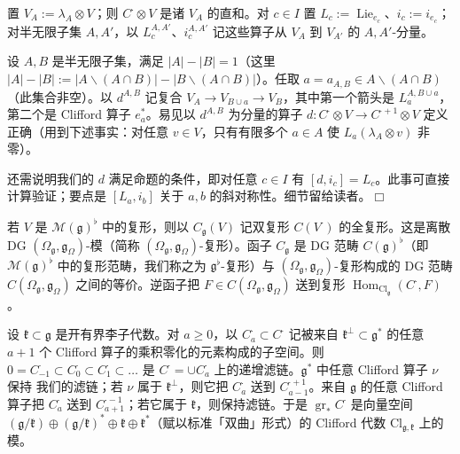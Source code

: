 置 $V_{A}:=\lambda_{A}\otimes V$；则 $C^{\cdot}\otimes V$ 是诸 $V_{A}$ 的直和。对 $c\in I$ 置 $L_{c}:=\operatorname{Lie}_{e_{c}}$、$i_{c}:=i_{e_{c}}$；对半无限子集 $A,A'$，以 $L^{A,A'}_{c}$、$i^{A,A'}_{c}$ 记这些算子从 $V_{A}$ 到 $V_{A'}$ 的 $A,A'$-分量。

设 $A,B$ 是半无限子集，满足 $|A|-|B|=1$（这里 $|A|-|B|:=|A\backslash(A\cap B)|-|B\backslash(A\cap B)|$）。任取 $a=a_{A,B}\in A\backslash(A\cap B)$（此集合非空）。以 $d^{A,B}$ 记复合 $V_{A}\to V_{B\cup a}\to V_{B}$，其中第一个箭头是 $L^{A,B\cup a}_{a}$，第二个是 Clifford 算子 $e^{*}_{a}$。易见以 $d^{A,B}$ 为分量的算子 $d:C^{\cdot}\otimes V\to C^{\cdot+1}\otimes V$ 定义正确（用到下述事实：对任意 $v\in V$，只有有限多个 $a\in A$ 使 $L_{a}(\lambda_{A}\otimes v)$ 非零）。

还需说明我们的 $d$ 满足命题的条件，即对任意 $c\in I$ 有 $[d,i_{c}]=L_{c}$。此事可直接计算验证；要点是 $[L_{a},i_{b}]$ 关于 $a,b$ 的斜对称性。细节留给读者。\hfill$\Box$

 若 $V$ 是 $\mathcal{M}(\mathfrak{g})^{\flat}$ 中的复形，则以 $C_{\mathfrak{g}}(V)$ 记双复形 $C(V^{\cdot})$ 的全复形。这是离散 DG $(\Omega_{\mathfrak{g}},\mathfrak{g}_{\Omega})$-模（简称 $(\Omega_{\mathfrak{g}},\mathfrak{g}_{\Omega})$-复形）。函子 $C_{\mathfrak{g}}$ 是 DG 范畴 $C(\mathfrak{g})^{\flat}$（即 $\mathcal{M}(\mathfrak{g})^{\flat}$ 中的复形范畴，我们称之为 $\mathfrak{g}^{\flat}$-复形）与 $(\Omega_{\mathfrak{g}},\mathfrak{g}_{\Omega})$-复形构成的 DG 范畴 $C(\Omega_{\mathfrak{g}},\mathfrak{g}_{\Omega})$ 之间的等价。逆函子把 $F\in C(\Omega_{\mathfrak{g}},\mathfrak{g}_{\Omega})$ 送到复形 $\operatorname{Hom}_{\mathrm{Cl}_{\mathfrak{g}}}(C^{\cdot},F)$。

 设 $\mathfrak{k}\subset\mathfrak{g}$ 是开有界李子代数。对 $a\ge0$，以 $C^{\cdot}_{a}\subset C^{\cdot}$ 记被来自 $\mathfrak{k}^{\perp}\subset\mathfrak{g}^{*}$ 的任意 $a+1$ 个 Clifford 算子的乘积零化的元素构成的子空间。则 $0=C^{\cdot}_{-1}\subset C^{\cdot}_{0}\subset C^{\cdot}_{1}\subset\ldots$ 是 $C^{\cdot}=\cup C^{\cdot}_{a}$ 上的递增滤链。$\mathfrak{g}^{*}$ 中任意 Clifford 算子 $\nu$ 保持%
我们的滤链；若 $\nu$ 属于 $\mathfrak{k}^{\perp}$，则它把 $C^{\cdot}_{a}$ 送到 $C^{\cdot+1}_{a-1}$。来自 $\mathfrak{g}$ 的任意 Clifford 算子把 $C^{\cdot}_{a}$ 送到 $C^{\cdot-1}_{a+1}$；若它属于 $\mathfrak{k}$，则保持滤链。于是 $\operatorname{gr}_{*}C^{\cdot}$ 是向量空间 $(\mathfrak{g}/\mathfrak{k})\oplus(\mathfrak{g}/\mathfrak{k})^{*}\oplus\mathfrak{k}\oplus\mathfrak{k}^{*}$（赋以标准「双曲」形式）的 Clifford 代数 $\mathrm{Cl}_{\mathfrak{g},\mathfrak{k}}$ 上的模。

